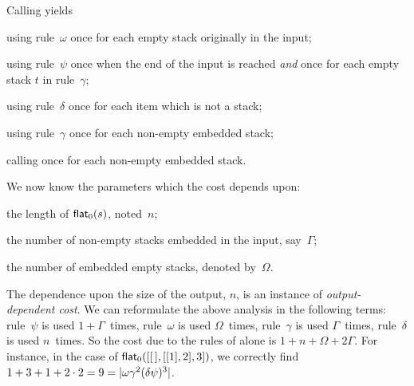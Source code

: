 Calling  yields
\begin{itemize*}

  \item using rule~\(\omega\) once for each empty stack originally in
    the input;

  \item using rule~\(\psi\) once when the end of the input is reached
    \emph{and} once for each empty stack \(t\) in rule~\(\gamma\);

  \item using rule~\(\delta\) once for each item which is not a stack;

  \item using rule~\(\gamma\) once for each non\hyp{}empty embedded
    stack;

  \item calling  once for each
    non\hyp{}empty embedded stack.

\end{itemize*}
We now know the parameters which the cost depends upon:
\begin{enumerate*}

  \item the length of
    \(\textsf{flat}_0(s)\), noted~\(n\);

  \item the number of non\hyp{}empty stacks embedded in the input,
    say~\(\Gamma\);

  \item the number of embedded empty stacks, denoted by~\(\Omega\).

\end{enumerate*}
The dependence upon the size of the output, \(n\), is an instance of
\emph{output\hyp{}dependent cost}. We can reformulate the above analysis in the following
terms: rule~\(\psi\) is used \(1 + \Gamma\)~times, rule~\(\omega\) is
used \(\Omega\)~times, rule~\(\gamma\) is used \(\Gamma\)~times,
rule~\(\delta\) is used \(n\)~times. So the cost due to the rules of
 alone is \(1 + n +
\Omega + 2\Gamma\). For instance, in the case of
\(\textsf{flat}_0([[\,],[[1],2],3])\), we correctly find \(1 + 3 + 1 + 2
\cdot 2 = 9 = \lvert{\omega\gamma^2(\delta\psi)^3}\rvert{}\).

